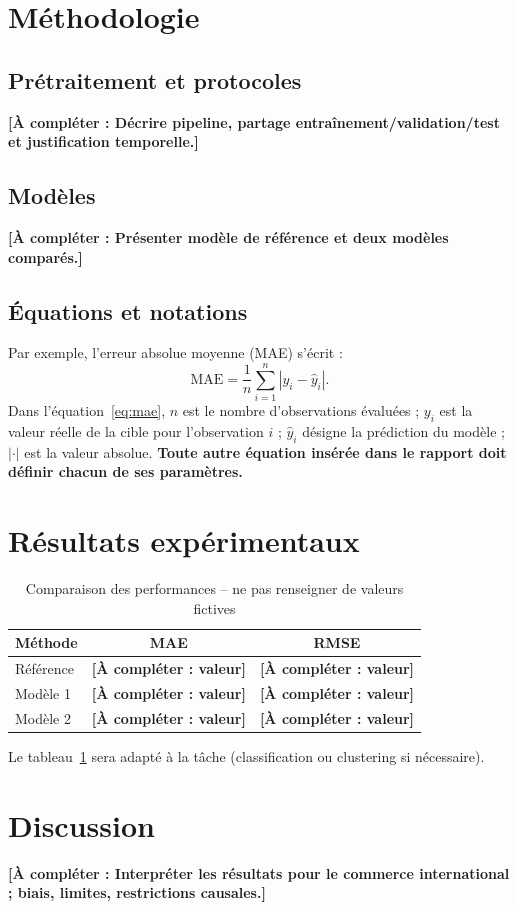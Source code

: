 \documentclass[11pt,a4paper]{article}
\newcommand{\achanger}[1]{\textcolor{blue!60!black}{\textbf{[À compléter : #1]}}}
\begin{document}
\section{Méthodologie}\label{sec:method}
\subsection{Prétraitement et protocoles}\achanger{Décrire pipeline, partage entraînement/validation/test et justification temporelle.}
\subsection{Modèles}\achanger{Présenter modèle de référence et deux modèles comparés.}
\subsection{Équations et notations}
Par exemple, l'erreur absolue moyenne (MAE) s'écrit :
\begin{equation}\label{eq:mae}
\mathrm{MAE}=\frac{1}{n}\sum_{i=1}^{n}\left|y_i-\widehat{y}_i\right|.
\end{equation}
Dans l'équation~\eqref{eq:mae}, $n$ est le nombre d'observations évaluées ; $y_i$ est la valeur réelle de la cible pour l'observation $i$ ; $\widehat{y}_i$ désigne la prédiction du modèle ; $|\cdot|$ est la valeur absolue. \textbf{Toute autre équation insérée dans le rapport doit définir chacun de ses paramètres.}
\section{Résultats expérimentaux}\label{sec:results}
\begin{table}[ht]\centering
\caption{Comparaison des performances -- ne pas renseigner de valeurs fictives}\label{tab:performances}
\begin{tabular}{lcc}\toprule Méthode & MAE & RMSE\\\midrule
Référence & \achanger{valeur} & \achanger{valeur}\\
Modèle 1 & \achanger{valeur} & \achanger{valeur}\\
Modèle 2 & \achanger{valeur} & \achanger{valeur}\\
\bottomrule\end{tabular}
\end{table}
Le tableau~\ref{tab:performances} sera adapté à la tâche (classification ou clustering si nécessaire).
\section{Discussion}\label{sec:discussion}
\achanger{Interpréter les résultats pour le commerce international ; biais, limites, restrictions causales.}
\end{document}
